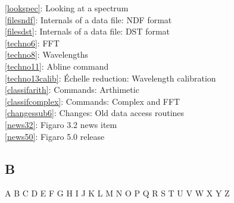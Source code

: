 \documentclass[11pt,twoside]{article}
\newcommand{\htmlref}[2]{#1}
\newcommand{\idxint}[2]{\ref{#1}: \htmlref{#2}{#1}}
\newcommand{\idxint}[2]{\htmlref{#2}{#1}}
\begin{document}
\begin{itemize}
   \idxint{lookspec}{Looking at a spectrum}\\
   \idxint{filesndf}{Internals of a data file: NDF format}\\
   \idxint{filesdst}{Internals of a data file: DST format}\\
   \idxint{techno6}{FFT}\\
   \idxint{techno8}{Wavelengths}\\
   \idxint{techno11}{Abline command}\\
   \idxint{techno13calib}{\'Echelle reduction: Wavelength calibration}\\
   \idxint{classifarith}{Commands: Arthimetic}\\
   \idxint{classifcomplex}{Commands: Complex and FFT}\\
   \idxint{changessub6}{Changes: Old data access routines}\\
   \idxint{news32}{Figaro 3.2 news item}\\
   \idxint{news50}{Figaro 5.0 release}
\end{itemize}

\subsection*{\label{index_B}B}

\begin{htmlonly}
\htmlref{A}{index_A}
B
\htmlref{C}{index_C}
\htmlref{D}{index_D}
\htmlref{E}{index_E}
\htmlref{F}{index_F}
\htmlref{G}{index_G}
\htmlref{H}{index_H}
\htmlref{I}{index_I}
\htmlref{J}{index_J}
\htmlref{K}{index_K}
\htmlref{L}{index_L}
\htmlref{M}{index_M}
\htmlref{N}{index_N}
\htmlref{O}{index_O}
\htmlref{P}{index_P}
\htmlref{Q}{index_Q}
\htmlref{R}{index_R}
\htmlref{S}{index_S}
\htmlref{T}{index_T}
\htmlref{U}{index_U}
\htmlref{V}{index_V}
\htmlref{W}{index_W}
\htmlref{X}{index_X}
\htmlref{Y}{index_Y}
Z
\end{htmlonly}
\end{document}
